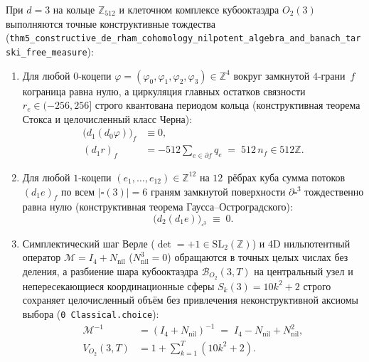 \begin{theorem}
\label{thm:mono-de-rham-measure}
При $d = 3$ на кольце $\mathbb{Z}_{512}$ и клеточном комплексе кубооктаэдра $O_2(3)$ выполняются точные конструктивные тождества (\texttt{thm5\_\allowbreak constructive\_\allowbreak de\_\allowbreak rham\_\allowbreak cohomology\_\allowbreak nilpotent\_\allowbreak algebra\_\allowbreak and\_\allowbreak banach\_\allowbreak tarski\_\allowbreak free\_\allowbreak measure}):
\begin{enumerate}[label=\textbf{\arabic*.},noitemsep]
\item Для любой $0$-коцепи $\varphi = (\varphi_0, \varphi_1, \varphi_2, \varphi_3) \in \mathbb{Z}^4$ вокруг замкнутой $4$-грани~$f$ кограница равна нулю, а циркуляция главных остатков связности $r_e \in (-256, 256]$ строго квантована периодом кольца (конструктивная теорема Стокса и целочисленный класс Черна):
  \begin{align}
    \bigl(d_1(d_0\varphi)\bigr)_f &\equiv 0, \label{eq:mono-stokes-d1d0} \\
    (d_1 r)_f &= -512 \sum_{e \in \partial f} q_e \;=\; 512\,n_f \in 512\mathbb{Z}. \label{eq:mono-chern-flux-512}
  \end{align}
\item Для любой $1$-коцепи $(e_1, \dots, e_{12}) \in \mathbb{Z}^{12}$ на $12$~рёбрах куба сумма потоков $(d_1 e)_f$ по всем $|\square(3)| = 6$ граням замкнутой поверхности $\partial\square^3$ тождественно равна нулю (конструктивная теорема Гаусса--Остроградского):
  \begin{equation}
    \label{eq:mono-gauss-d2d1}
    \bigl(d_2(d_1 e)\bigr)_{\square^3} \;\equiv\; 0.
  \end{equation}
\item Симплектический шаг Верле ($\det = +1 \in \mathrm{SL}_2(\mathbb{Z})$) и 4D нильпотентный оператор $\mathcal{M} = I_4 + N_{\mathrm{nil}}$ ($N_{\mathrm{nil}}^3 = 0$) обращаются в точных целых числах без деления, а разбиение шара кубооктаэдра $\mathcal{B}_{O_2}(3, T)$ на центральный узел и непересекающиеся координационные сферы $S_k(3) = 10k^2 + 2$ строго сохраняет целочисленный объём без привлечения неконструктивной аксиомы выбора (\texttt{0 Classical.choice}):
  \begin{align}
    \mathcal{M}^{-1} &= (I_4 + N_{\mathrm{nil}})^{-1} \;=\; I_4 - N_{\mathrm{nil}} + N_{\mathrm{nil}}^2, \label{eq:mono-nilpotent-inv} \\
    V_{O_2}(3, T) &= 1 + \sum_{k=1}^T (10k^2 + 2). \label{eq:mono-measure-additivity}
  \end{align}
\end{enumerate}
\end{theorem}

